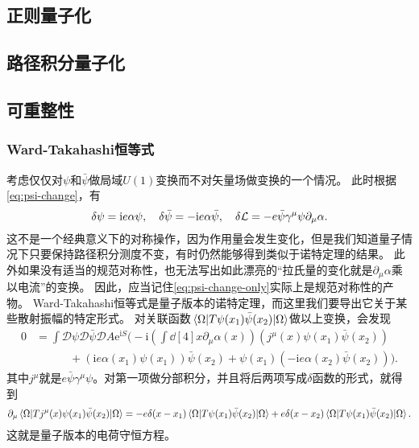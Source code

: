 \documentclass[hyperref, UTF8, a4paper]{ctexart}
\newcommand*{\ii}{\mathrm{i}}
\newcommand*{\ee}{\mathrm{e}}
\newcommand*{\fd}[1]{{\mathcal{D} #1}}
\begin{document}
\subsection{正则量子化}

\subsection{路径积分量子化}

\subsection{可重整性}

\subsubsection{Ward-Takahashi恒等式}

考虑仅仅对$\psi$和$\bar{\psi}$做局域$U(1)$变换而不对矢量场做变换的一个情况。
此时根据\eqref{eq:psi-change}，有
\begin{equation}
    \var{\psi} = \ii e \alpha \psi, \quad \var{\bar{\psi}} = - \ii e \alpha \bar{\psi}, \quad \var{\mathcal{L}} = - e \bar{\psi} \gamma^\mu \psi \partial_\mu \alpha.
    \label{eq:psi-change-only}
\end{equation}
这不是一个经典意义下的对称操作，因为作用量会发生变化，但是我们知道量子情况下只要保持路径积分测度不变，有时仍然能够得到类似于诺特定理的结果。
此外如果没有适当的规范对称性，也无法写出如此漂亮的“拉氏量的变化就是$\partial_\mu \alpha$乘以电流”的变换。
因此，应当记住\eqref{eq:psi-change-only}实际上是规范对称性的产物。
Ward-Takahashi恒等式是量子版本的诺特定理，而这里我们要导出它关于某些散射振幅的特定形式。
对关联函数$\mel{\Omega}{T \psi(x_1) \bar{\psi}(x_2)}{\Omega}$做以上变换，会发现
\[
    \begin{aligned}
        0 &= \int \fd{\psi} \fd{\bar{\psi}} \fd{A} \ee^{\ii S} \big( - \ii (\int \dd[4]{x} \partial_\mu \alpha(x)) (j^\mu(x) \psi(x_1) \bar{\psi}(x_2) ) \\
        & \quad \quad \quad + (\ii e \alpha(x_1) \psi(x_1)) \bar{\psi}(x_2) + \psi(x_1)(- \ii e \alpha(x_2) \bar{\psi}(x_2)) \big).
    \end{aligned}
\]
其中$j^\mu$就是$e \bar{\psi} \gamma^\mu \psi$。对第一项做分部积分，并且将后两项写成$\delta$函数的形式，就得到
\begin{equation}
    \partial_\mu \mel{\Omega}{T j^\mu(x) \psi(x_1) \bar{\psi}(x_2)}{\Omega} = - e \delta(x - x_1) \mel{\Omega}{T \psi(x_1) \bar{\psi}(x_2)}{\Omega} + e \delta(x - x_2) \mel{\Omega}{T \psi(x_1) \bar{\psi}(x_2)}{\Omega}.
\end{equation}
这就是量子版本的电荷守恒方程。
\end{document}
